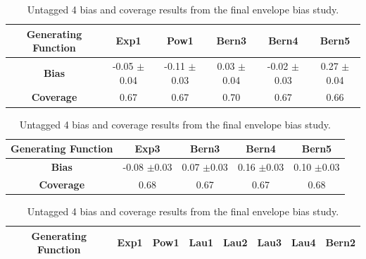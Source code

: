 \begin{table}
    \vspace*{0.25 cm}
    \begin{subtable}{\textwidth}
        \footnotesize
        \centering
        \begin{tabular}{|c|ccccc|} \hline
            \textbf{Generating Function} &Exp1 &Pow1 &Bern3&Bern4&Bern5\\ \hline
            \textbf{Bias} &\tabincell{c}{-0.05\\$\pm$0.04}&\tabincell{c}{-0.11\\$\pm$0.03}&\tabincell{c}{0.03\\$\pm$0.04}&\tabincell{c}{-0.02\\$\pm$0.03}&\tabincell{c}{0.27\\$\pm$0.04}\\ 
            \textbf{Coverage} & 0.67&0.67 & 0.70 &0.67 & 0.66\\ \hline
        \end{tabular}
        \caption{Untagged 3 bias and coverage results from the final envelope bias study.}
        \label{tab:bias_cat3_m105-170}
    \end{subtable}
    \vspace*{0.25 cm}
    \begin{subtable}{\textwidth}
        \footnotesize
        \centering
        \begin{tabular}{|c|cccc|} \hline
            \textbf{Generating Function} &Exp3 &Bern3 &Bern4 &Bern5\\ \hline
            \textbf{Bias} &\tabincell{c}{-0.08\\$\pm$0.03} &\tabincell{c}{0.07\\$\pm$0.03} &\tabincell{c}{0.16\\$\pm$0.03} &\tabincell{c}{0.10\\$\pm$0.03}\\ 
            \textbf{Coverage} & 0.68 & 0.67 & 0.67 & 0.68\\ \hline
        \end{tabular}
        \caption{Untagged 4 bias and coverage results from the final envelope bias study.}
        \label{tab:bias_cat4_m105-170}
    \end{subtable}
    \vspace*{0.25 cm}
\begin{subtable}{\textwidth}
    \footnotesize
    \centering
    \begin{tabular}{|c|ccccccc|} \hline
        \textbf{Generating Function} &Exp1 &Pow1 &Lau1 &Lau2 &Lau3 &Lau4 &Bern2\\ \hline

\end{tabular}
\end{subtable}
\end{table}
